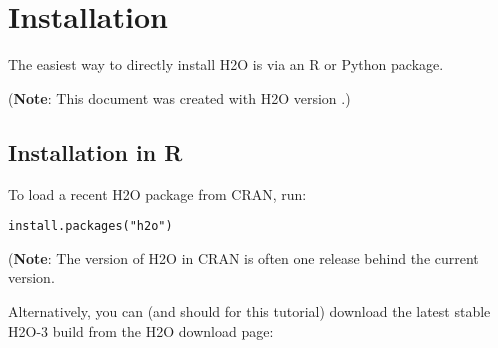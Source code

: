\section{Installation} 

The easiest way to directly install H2O is  via an R or Python package.

({\bf{Note}}: This document was created with H2O version \waterVersion.)

\subsection{Installation in R}

To load a recent H2O package from CRAN, run:

\begin{lstlisting}[style=R]
install.packages("h2o")
\end{lstlisting}

({\bf{Note}}: The version of H2O in CRAN is often one release behind the current version.

Alternatively, you can (and should for this tutorial) download the
latest stable H2O-3 build from the H2O download page:

